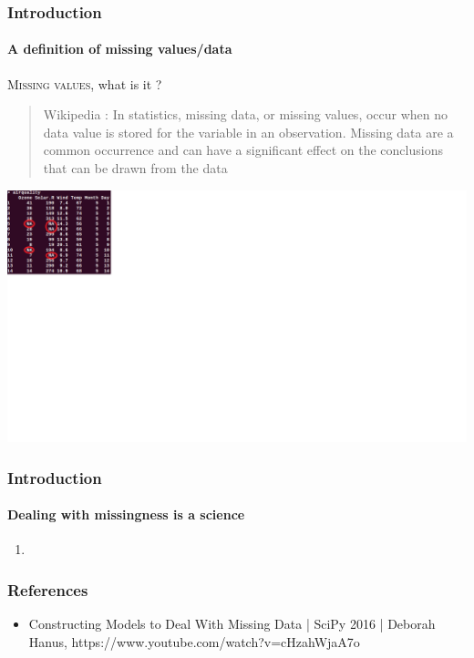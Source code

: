 \documentclass{beamer}
\begin{document}
\begin{frame}
  \frametitle{Introduction}
  \framesubtitle{A definition of missing values/data}
  \textsc{Missing values}, what is it ?
  \begin{quote}
  Wikipedia : In statistics, missing data, or missing values, occur when no data value is stored for the variable in an observation. Missing data are a common occurrence and can have a significant effect on the conclusions that can be drawn from the data
  \end{quote}
  \includegraphics[width=25cm]{missingvalues.png}
\end{frame}

\begin{frame}
  \frametitle{Introduction}
  \framesubtitle{Dealing with missingness is a science}

  \begin{enumerate}
      \item<1- | alert@1> 
  \end{enumerate}

  
\end{frame}

\begin{frame}
  \frametitle{References}
	\begin{itemize}
		\item<1->Constructing Models to Deal With Missing Data | SciPy 2016 | Deborah Hanus, https://www.youtube.com/watch?v=cHzahWjaA7o
	\end{itemize}
\end{frame}
\end{document}

